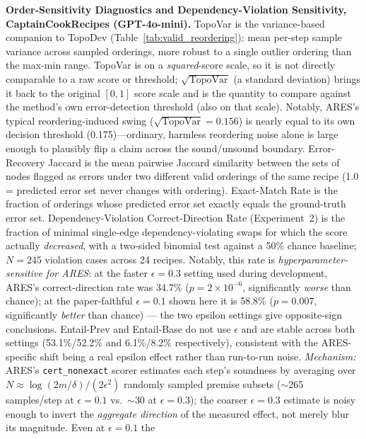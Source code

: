 \begin{table}[t]
\centering
\caption{
\textbf{Order-Sensitivity Diagnostics and Dependency-Violation Sensitivity, CaptainCookRecipes (GPT-4o-mini).}
TopoVar is the variance-based companion to TopoDev (Table~\ref{tab:valid_reordering}):
mean per-step sample variance across sampled orderings, more robust to a single outlier
ordering than the max-min range. TopoVar is on a \emph{squared}-score scale, so it is not
directly comparable to a raw score or threshold; $\sqrt{\text{TopoVar}}$ (a standard
deviation) brings it back to the original $[0,1]$ score scale and is the quantity to
compare against the method's own error-detection threshold (also on that scale).
Notably, ARES's typical reordering-induced swing ($\sqrt{\text{TopoVar}}=0.156$) is
nearly equal to its own decision threshold (0.175)---ordinary, harmless reordering
noise alone is large enough to plausibly flip a claim across the sound/unsound boundary.
Error-Recovery Jaccard is the mean pairwise Jaccard
similarity between the sets of nodes flagged as errors under two different valid
orderings of the same recipe (1.0 = predicted error set never changes with ordering).
Exact-Match Rate is the fraction of orderings whose predicted error set exactly equals
the ground-truth error set. Dependency-Violation Correct-Direction Rate (Experiment~2) is
the fraction of minimal single-edge dependency-violating swaps for which the score
actually \emph{decreased}, with a two-sided binomial test against a 50\% chance baseline;
$N=245$ violation cases across 24 recipes. Notably, this rate is \emph{hyperparameter-
sensitive for ARES}: at the faster $\epsilon=0.3$ setting used during development, ARES's
correct-direction rate was 34.7\% ($p=2\times10^{-6}$, significantly \emph{worse} than
chance); at the paper-faithful $\epsilon=0.1$ shown here it is 58.8\%
($p=0.007$, significantly \emph{better} than chance) --- the two epsilon settings give
opposite-sign conclusions. Entail-Prev and Entail-Base do not use $\epsilon$ and are
stable across both settings (53.1\%/52.2\% and 6.1\%/8.2\% respectively), consistent with
the ARES-specific shift being a real epsilon effect rather than run-to-run noise.
\emph{Mechanism:} ARES's \texttt{cert\_nonexact} scorer estimates each step's soundness
by averaging over $N\!\approx\!\log(2m/\delta)/(2\epsilon^2)$ randomly sampled premise
subsets ($\sim$265 samples/step at $\epsilon=0.1$ vs.\ $\sim$30 at $\epsilon=0.3$); the
coarser $\epsilon=0.3$ estimate is noisy enough to invert the \emph{aggregate direction}
of the measured effect, not merely blur its magnitude. Even at $\epsilon=0.1$ the
}
\end{table}

